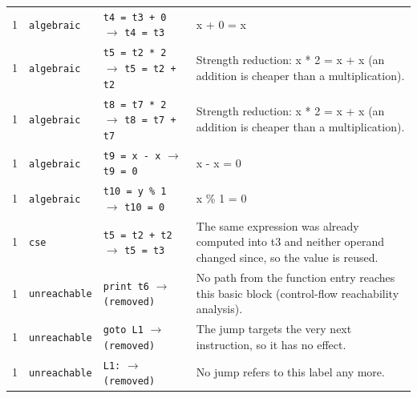 \begin{longtable}{@{}rp{}p{}p{}@{}}
1 & \texttt{algebraic} & \texttt{\scriptsize t4 = t3 + 0} $\rightarrow$ \texttt{\scriptsize t4 = t3} & {\scriptsize x + 0 = x}\\
1 & \texttt{algebraic} & \texttt{\scriptsize t5 = t2 * 2} $\rightarrow$ \texttt{\scriptsize t5 = t2 + t2} & {\scriptsize Strength reduction: x * 2 = x + x (an addition is cheaper than a multiplication).}\\
1 & \texttt{algebraic} & \texttt{\scriptsize t8 = t7 * 2} $\rightarrow$ \texttt{\scriptsize t8 = t7 + t7} & {\scriptsize Strength reduction: x * 2 = x + x (an addition is cheaper than a multiplication).}\\
1 & \texttt{algebraic} & \texttt{\scriptsize t9 = x - x} $\rightarrow$ \texttt{\scriptsize t9 = 0} & {\scriptsize x - x = 0}\\
1 & \texttt{algebraic} & \texttt{\scriptsize t10 = y \% 1} $\rightarrow$ \texttt{\scriptsize t10 = 0} & {\scriptsize x \% 1 = 0}\\
1 & \texttt{cse} & \texttt{\scriptsize t5 = t2 + t2} $\rightarrow$ \texttt{\scriptsize t5 = t3} & {\scriptsize The same expression was already computed into t3 and neither operand changed since, so the value is reused.}\\
1 & \texttt{unreachable} & \texttt{\scriptsize print t6} $\rightarrow$ \texttt{\scriptsize (removed)} & {\scriptsize No path from the function entry reaches this basic block (control-flow reachability analysis).}\\
1 & \texttt{unreachable} & \texttt{\scriptsize goto L1} $\rightarrow$ \texttt{\scriptsize (removed)} & {\scriptsize The jump targets the very next instruction, so it has no effect.}\\
1 & \texttt{unreachable} & \texttt{\scriptsize L1:} $\rightarrow$ \texttt{\scriptsize (removed)} & {\scriptsize No jump refers to this label any more.}\\
\bottomrule
\end{longtable}
